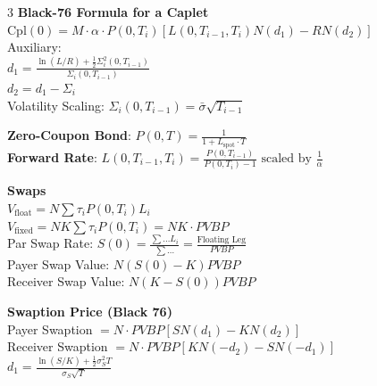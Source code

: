 \documentclass[8pt, a4paper, landscape]{extarticle}
\begin{document}
\begin{multicols*}{3}
\textbf{Black-76 Formula for a Caplet} \\
$\text{Cpl}(0) = M \cdot \alpha \cdot P(0, T_i) [L(0, T_{i-1}, T_i) N(d_1) - R N(d_2)]$ \\
Auxiliary: \\
$d_1 = \frac{\ln(L/R) + \frac{1}{2}\Sigma_i^2(0, T_{i-1})}{\Sigma_i(0, T_{i-1})}$ \\
$d_2 = d_1 - \Sigma_i$ \\
Volatility Scaling: $\Sigma_i(0, T_{i-1}) = \bar{\sigma}\sqrt{T_{i-1}}$

\textbf{Zero-Coupon Bond}: $P(0, T) = \frac{1}{1 + L_{\text{spot}} \cdot T}$ \\
\textbf{Forward Rate}: $L(0, T_{i-1}, T_i) = \frac{P(0, T_{i-1})}{P(0, T_i) - 1} \text{ scaled by } \frac{1}{\alpha}$

\textbf{Swaps} \\
$V_{\text{float}} = N \sum \tau_i P(0, T_i) L_i$ \\
$V_{\text{fixed}} = NK \sum \tau_i P(0, T_i) = NK \cdot PVBP$ \\
Par Swap Rate: $S(0) = \frac{\sum \dots L_i}{\sum \dots} = \frac{\text{Floating Leg}}{PVBP}$ \\
Payer Swap Value: $N (S(0) - K) PVBP$ \\
Receiver Swap Value: $N (K - S(0)) PVBP$

\textbf{Swaption Price (Black 76)} \\
Payer Swaption $= N \cdot PVBP [ S N(d_1) - K N(d_2) ]$ \\
Receiver Swaption $= N \cdot PVBP [ K N(-d_2) - S N(-d_1) ]$ \\
$d_1 = \frac{\ln(S/K) + \frac{1}{2}\sigma_S^2 T}{\sigma_S \sqrt{T}}$

\end{multicols*}
\end{document}

